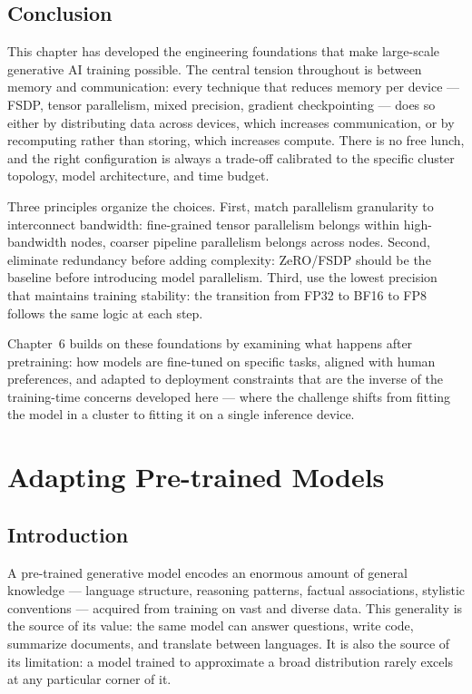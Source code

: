 \documentclass{book}
\begin{document}
\section{Conclusion}
\label{sec:pretraining_conclusion}

This chapter has developed the engineering foundations that make large-scale
generative AI training possible. The central tension throughout is between
memory and communication: every technique that reduces memory per device ---
FSDP, tensor parallelism, mixed precision, gradient checkpointing --- does
so either by distributing data across devices, which increases communication,
or by recomputing rather than storing, which increases compute. There is no
free lunch, and the right configuration is always a trade-off calibrated
to the specific cluster topology, model architecture, and time budget.

Three principles organize the choices. First, match parallelism granularity
to interconnect bandwidth: fine-grained tensor parallelism belongs within
high-bandwidth nodes, coarser pipeline parallelism belongs across nodes.
Second, eliminate redundancy before adding complexity: ZeRO/FSDP should
be the baseline before introducing model parallelism. Third, use the lowest
precision that maintains training stability: the transition from FP32 to
BF16 to FP8 follows the same logic at each step.

Chapter~6 builds on these foundations by examining what happens after
pretraining: how models are fine-tuned on specific tasks, aligned with
human preferences, and adapted to deployment constraints that are the
inverse of the training-time concerns developed here --- where the challenge
shifts from fitting the model in a cluster to fitting it on a single
inference device.

\chapter{Adapting Pre-trained Models}

\section{Introduction}
\label{sec:adapt_intro}

A pre-trained generative model encodes an enormous amount of general
knowledge --- language structure, reasoning patterns, factual associations,
stylistic conventions --- acquired from training on vast and diverse data.
This generality is the source of its value: the same model can answer
questions, write code, summarize documents, and translate between languages.
It is also the source of its limitation: a model trained to approximate a
broad distribution rarely excels at any particular corner of it.
\end{document}
